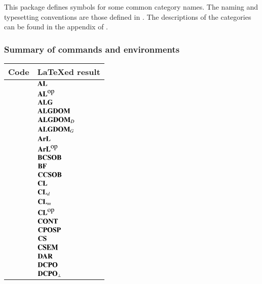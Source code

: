 {{This package defines symbols for some common category names. The naming and typesetting conventions are those defined in \cite{gierz-2003}. The descriptions of the categories can be found in the appendix of \cite{gierz-2003}.

\subsubsection{Summary of commands and environments}

\begin{footnotesize}
\begin{longtable}{ll}
\hline
Code                  & {\LaTeX}ed result   \\
\hline
\code{$\CatAL$}       & $\CatAL$            \\
\code{$\CatALop$}     & $\CatALop$          \\
\code{$\CatALG$}      & $\CatALG$           \\
\code{$\CatALGDOM$}   & $\CatALGDOM$        \\
\code{$\CatALGDOMD$}  & $\CatALGDOMD$       \\
\code{$\CatALGDOMG$}  & $\CatALGDOMG$       \\
\code{$\CatArL$}      & $\CatArL$           \\
\code{$\CatArLop$}    & $\CatArLop$         \\
\code{$\CatBCSOB$}    & $\CatBCSOB$         \\
\code{$\CatBF$}       & $\CatBF$            \\
\code{$\CatCCSOB$}    & $\CatCCSOB$         \\
\code{$\CatCL$}       & $\CatCL$            \\
\code{$\CatCLd$}      & $\CatCLd$           \\
\code{$\CatCLm$}      & $\CatCLm$           \\
\code{$\CatCLop$}     & $\CatCLop$          \\
\code{$\CatCONT$}     & $\CatCONT$          \\
\code{$\CatCPOSP$}    & $\CatCPOSP$         \\
\code{$\CatCS$}       & $\CatCS$            \\
\code{$\CatCSEM$}     & $\CatCSEM$          \\
\code{$\CatDAR$}      & $\CatDAR$           \\
\code{$\CatDCPO$}     & $\CatDCPO$          \\
\code{$\CatDCPOp$}    & $\CatDCPOp$         \\

\end{longtable}
\end{footnotesize}}}
